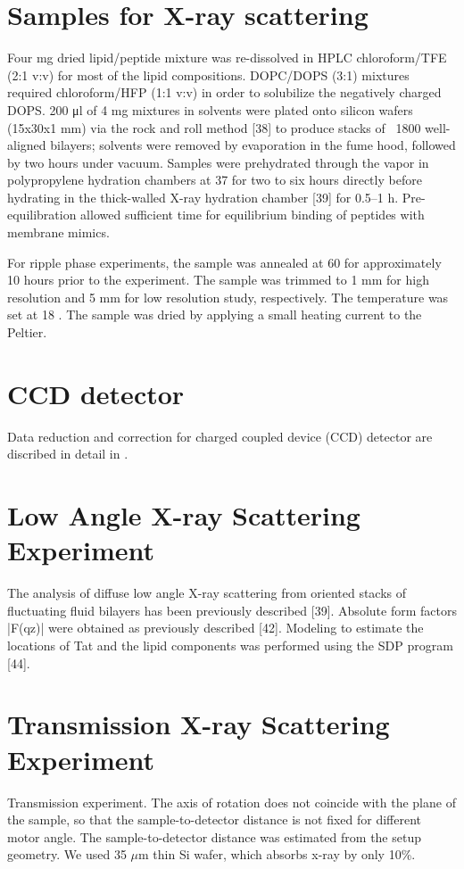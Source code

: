 \section{Samples for X-ray scattering}
Four mg dried lipid/peptide mixture was re-dissolved in HPLC chloroform/TFE 
(2:1 v:v)
for most of the lipid compositions. DOPC/DOPS (3:1) mixtures required
chloroform/HFP (1:1 v:v) in order to solubilize the negatively charged DOPS. 
200 μl of 4 mg
mixtures in solvents were plated onto silicon wafers (15x30x1 mm) via the rock 
and roll method
[38] to produce stacks of ~1800 well-aligned bilayers; solvents were removed by 
evaporation in
the fume hood, followed by two hours under vacuum. Samples were prehydrated 
through the
vapor in polypropylene hydration chambers at 37 \degC for two to six hours 
directly before hydrating in the
thick-walled X-ray hydration chamber [39] for 0.5–1 h. Pre-equilibration 
allowed 
sufficient time
for equilibrium binding of peptides with membrane mimics.

For ripple phase experiments, the sample was annealed at 60 \degC for approximately
10 hours prior to the experiment. The sample was trimmed to 1 mm for high
resolution and 5 mm for low resolution study, respectively. The temperature
was set at 18 \degC. The sample was dried by applying a small heating 
current to the Peltier.

\section{CCD detector}
Data reduction and correction for charged coupled device (CCD) detector
are discribed in detail in \cite{ref:Burner}.

\section{Low Angle X-ray Scattering Experiment}
The analysis of diffuse low angle X-ray scattering from oriented stacks of 
fluctuating fluid bilayers has been previously described [39]. Absolute form 
factors |F(qz)| were obtained as previously described [42]. Modeling to 
estimate the locations of Tat and the lipid components
was performed using the SDP program [44].

\section{Transmission X-ray Scattering Experiment}
Transmission experiment. The axis of rotation does not coincide with the
plane of the sample, so that the sample-to-detector distance is not fixed
for different motor angle. The sample-to-detector distance was estimated
from the setup geometry. We used 35 $\mu$m thin Si wafer, which absorbs
x-ray by only 10\%. 

